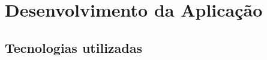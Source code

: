 \chapter{Desenvolvimento da Aplicação}





\section{Tecnologias utilizadas}
\begin{comment}
\section{Integrações}
Nessa seção serão citadas as possíveis integrações que nossa aplicação terá, que foram decididas baseadas em outras aplicações do mercado.

\subsection{Login com o Google e LinkedIn}
Pensando na experiência de usuário, nossa aplicação terá a opção do estudante se logar através do \ac{sso} dessas empresas. Dessa forma, não será necessário digitar a senha toda vez que o usuário for usar nosso \emph{website}, precisando apenas clicar um botão e fazer o login em uma dessas alternativas.

\subsection{Entrar em contato via \emph{Whatsapp}}
Nossa aplicação terá, também, uma forma da empresa contatar o estudante via Whatsapp. Essa integração será feita via \ac{api} disponibilizada pela própria empresa que mantém o aplicativo (Meta). Dessa forma, com apenas um clique, será possível enviar uma mensagem diretamente ao estudante.
\end{comment}


